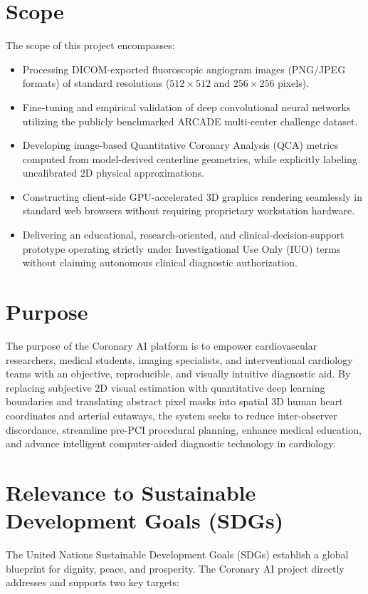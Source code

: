 \section{Scope}
The scope of this project encompasses:
\begin{itemize}
    \item Processing DICOM-exported fluoroscopic angiogram images (PNG/JPEG formats) of standard resolutions ($512 \times 512$ and $256 \times 256$ pixels).
    \item Fine-tuning and empirical validation of deep convolutional neural networks utilizing the publicly benchmarked ARCADE multi-center challenge dataset.
    \item Developing image-based Quantitative Coronary Analysis (QCA) metrics computed from model-derived centerline geometries, while explicitly labeling uncalibrated 2D physical approximations.
    \item Constructing client-side GPU-accelerated 3D graphics rendering seamlessly in standard web browsers without requiring proprietary workstation hardware.
    \item Delivering an educational, research-oriented, and clinical-decision-support prototype operating strictly under Investigational Use Only (IUO) terms without claiming autonomous clinical diagnostic authorization.
\end{itemize}

\section{Purpose}
The purpose of the Coronary AI platform is to empower cardiovascular researchers, medical students, imaging specialists, and interventional cardiology teams with an objective, reproducible, and visually intuitive diagnostic aid. By replacing subjective 2D visual estimation with quantitative deep learning boundaries and translating abstract pixel masks into spatial 3D human heart coordinates and arterial cutaways, the system seeks to reduce inter-observer discordance, streamline pre-PCI procedural planning, enhance medical education, and advance intelligent computer-aided diagnostic technology in cardiology.

\section{Relevance to Sustainable Development Goals (SDGs)}
The United Nations Sustainable Development Goals (SDGs) establish a global blueprint for dignity, peace, and prosperity. The Coronary AI project directly addresses and supports two key targets:

